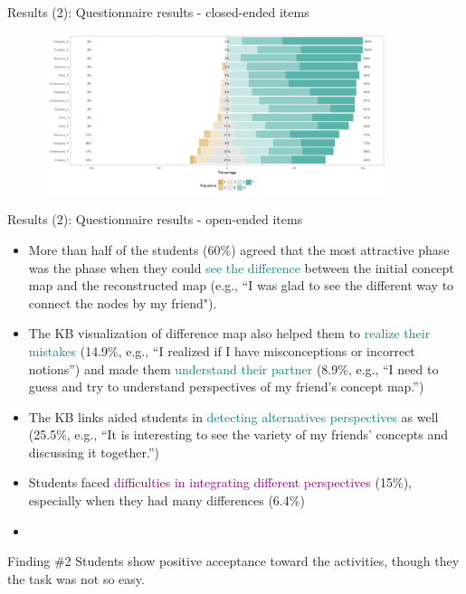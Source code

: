 \begin{frame}{Results (2): Questionnaire results - closed-ended items}
    \begin{figure}[tb]
    \begin{center}
        \includegraphics[width=100mm]{images/rqa_affective_response.pdf}
    \end{center}
    \label{a1::questionnaire}
\end{figure}
\end{frame}
\begin{frame}{Results (2): Questionnaire results - open-ended items}
\begin{itemize}
    \item <1> More than half of the students (60\%) agreed that the most attractive phase was the phase when they could \textcolor{teal}{see the difference} between the initial concept map and the reconstructed map (e.g., “I was glad to see the different way to connect the nodes by my friend").
    \item <2> The KB visualization of difference map also helped them to \textcolor{teal}{realize their mistakes} (14.9\%, e.g., “I realized if I have misconceptions or incorrect notions”) and made them \textcolor{teal}{understand  their partner} (8.9\%, e.g., “I need to guess and try to understand perspectives of my friend's concept map.”)
    \item <3> The KB links aided students in \textcolor{teal}{detecting alternatives perspectives} as well (25.5\%, e.g., “It is interesting to see the variety of my friends’ concepts and discussing it together.”)
    \item <4> Students faced \textcolor{purple}{difficulties in integrating different perspectives} (15\%), especially when they had many differences (6.4\%)\item 
\end{itemize}
\end{frame}
\begin{frame}{}
\begin{block}{Finding \#2}
    Students show positive acceptance toward the activities, though they the task was not so easy. 
\end{block}

\end{frame}

